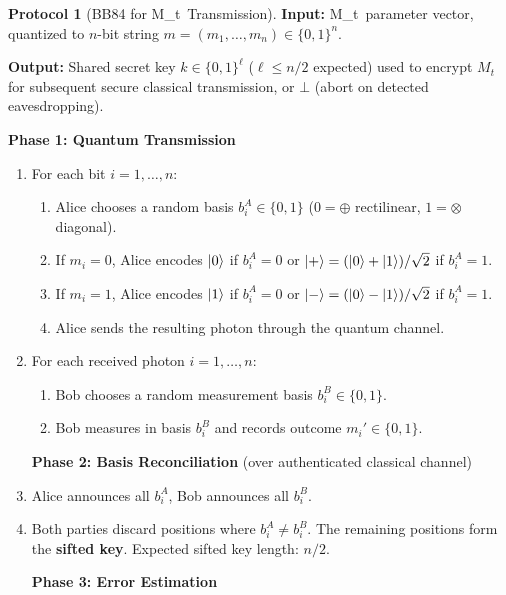 \documentclass[11pt,a4paper]{article}
\theoremstyle{plain}
\theoremstyle{definition}
\newtheorem{protocol}[theorem]{Protocol}
\theoremstyle{remark}
\newcommand{\Mt}{M_t}
\begin{document}
\begin{protocol}[BB84 for \Mt\ Transmission]\label{prot:bb84_mt}
\textbf{Input:} \Mt\ parameter vector, quantized to $n$-bit string
$m = (m_1,\ldots,m_n) \in \{0,1\}^n$.

\textbf{Output:} Shared secret key $k \in \{0,1\}^{\ell}$ ($\ell \leq n/2$ expected)
used to encrypt $\Mt$ for subsequent secure classical transmission,
or $\bot$ (abort on detected eavesdropping).

\medskip
\noindent\textbf{Phase 1: Quantum Transmission}

\begin{enumerate}[label=1.\arabic*]
  \item For each bit $i = 1,\ldots,n$:
  \begin{enumerate}
    \item Alice chooses a random basis $b_i^A \in \{0,1\}$
          ($0 = \oplus$ rectilinear, $1 = \otimes$ diagonal).
    \item If $m_i = 0$, Alice encodes $\ket{0}$ if $b_i^A = 0$
          or $\ket{+} = (\ket{0}+\ket{1})/\sqrt{2}$ if $b_i^A = 1$.
    \item If $m_i = 1$, Alice encodes $\ket{1}$ if $b_i^A = 0$
          or $\ket{-} = (\ket{0}-\ket{1})/\sqrt{2}$ if $b_i^A = 1$.
    \item Alice sends the resulting photon through the quantum channel.
  \end{enumerate}
  
  \item For each received photon $i = 1,\ldots,n$:
  \begin{enumerate}
    \item Bob chooses a random measurement basis $b_i^B \in \{0,1\}$.
    \item Bob measures in basis $b_i^B$ and records outcome $m_i' \in \{0,1\}$.
  \end{enumerate}

  \medskip
  \noindent\textbf{Phase 2: Basis Reconciliation} (over authenticated classical channel)

  \item Alice announces all $b_i^A$, Bob announces all $b_i^B$.
  \item Both parties discard positions where $b_i^A \neq b_i^B$.
        The remaining positions form the \textbf{sifted key}.
        Expected sifted key length: $n/2$.

  \medskip
  \noindent\textbf{Phase 3: Error Estimation}


\end{enumerate}
\end{protocol}
\end{document}
